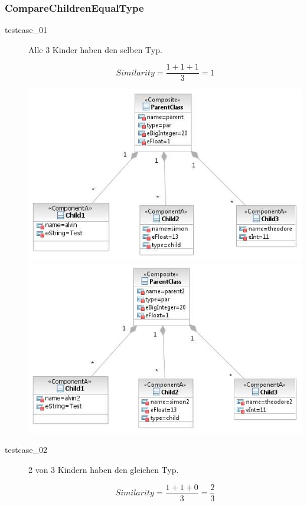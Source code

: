 \documentclass[a4paper]{article}
\begin{document}
\subsubsection{CompareChildrenEqualType}

  \begin{description}
  \item[testcase\_01]  Alle 3 Kinder haben den selben Typ.
    
   \begin{equation*}
   Similarity = \frac{1+1+1}{3}=1
   \end{equation*}
    
	\includegraphics[scale=0.5]{CompareChildrenEqualTypeTestScreens/Testcase01model1.jpeg}
	\includegraphics[scale=0.5]{CompareChildrenEqualTypeTestScreens/Testcase01model2.jpeg}

  \item[testcase\_02] 2 von 3 Kindern haben den gleichen Typ.
    
   \begin{equation*}
   Similarity = \frac{1+1+0}{3}=\frac{2}{3}
   \end{equation*}
    

\end{description}
\end{document}
